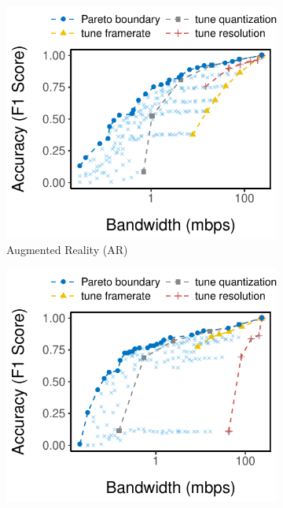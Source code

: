 \begin{figure}[htb]
  \centering
  \begin{subfigure}[t]{0.32\textwidth}
    \centering
    \includegraphics[width=\textwidth]{figures/profile-darknet.pdf}
    \caption{Augmented Reality (AR)}
    \label{fig:ar-profile}
  \end{subfigure}
  \hfill
  \begin{subfigure}[t]{0.32\textwidth}
    \centering
    \includegraphics[width=\textwidth]{figures/profile-mot.pdf}

\end{subfigure}
\end{figure}
